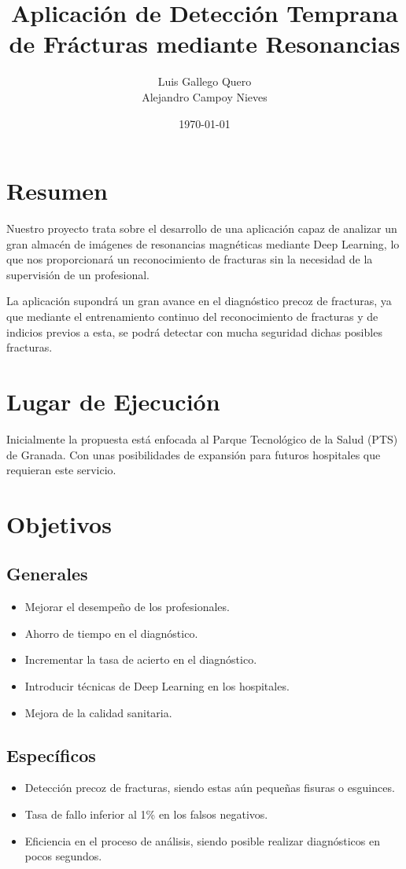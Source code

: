 \documentclass[a4paper,12pt,oneside]{article}
\title{Aplicación de Detección Temprana de Frácturas mediante Resonancias}
\author{Luis Gallego Quero \\ Alejandro Campoy Nieves}
\date{\today}
\begin{document}
\maketitle			
 
\section{Resumen}

Nuestro proyecto trata sobre el desarrollo de una aplicación capaz de analizar un gran almacén de imágenes de resonancias magnéticas mediante Deep Learning, lo que nos proporcionará un reconocimiento de fracturas sin la necesidad de la supervisión de un profesional. 

La aplicación supondrá un gran avance en el diagnóstico precoz de fracturas, ya que mediante el entrenamiento continuo del reconocimiento de fracturas y de indicios previos a esta, se podrá detectar con mucha seguridad dichas posibles fracturas.

\section{Lugar de Ejecución}

Inicialmente la propuesta está enfocada al Parque Tecnológico de la Salud (PTS) de Granada. Con unas posibilidades de expansión para futuros hospitales que requieran este servicio.

\section{Objetivos}
\subsection{Generales} 
\begin{itemize}
	\item Mejorar el desempeño de los profesionales.
	\item Ahorro de tiempo en el diagnóstico.
	\item Incrementar la tasa de acierto en el diagnóstico.
	\item Introducir técnicas de Deep Learning en los hospitales.
	\item Mejora de la calidad sanitaria.
\end{itemize}

\subsection{Específicos}
\begin{itemize}
	\item Detección precoz de fracturas, siendo estas aún pequeñas fisuras o esguinces.
	\item Tasa de fallo inferior al 1\% en los falsos negativos.
	\item Eficiencia en el proceso de análisis, siendo posible realizar diagnósticos en pocos segundos.
\end{itemize}
\end{document}
